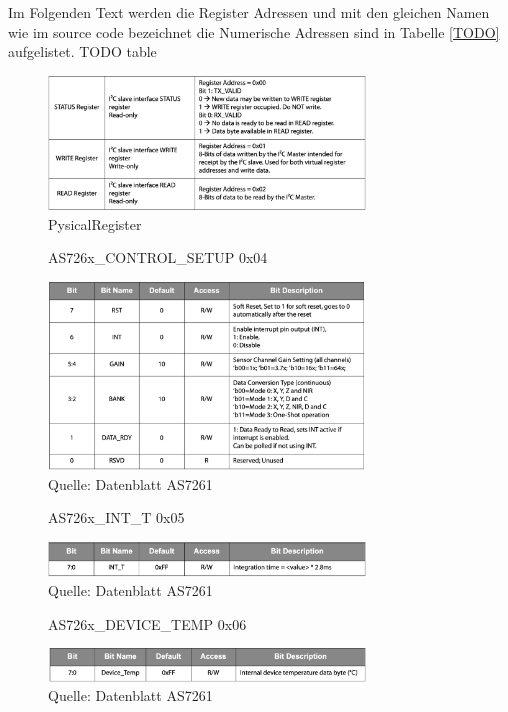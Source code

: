 Im Folgenden Text werden die Register Adressen und mit den gleichen Namen wie im source code bezeichnet die Numerische Adressen sind in Tabelle \ref{TODO} aufgelistet. TODO table

\begin{figure}[H]
\centering
\includegraphics[width=0.75\textwidth]{img/PysicalRegister}
\caption{PysicalRegister}
\label{fig:PysicalRegister}
\end{figure}

\begin{figure}[H]
\centering
\caption{AS726x\_CONTROL\_SETUP 0x04}
\includegraphics[width=0.75\textwidth]{img/AS726x_CONTROL_SETUP}
\caption*{Quelle: Datenblatt AS7261}
\label{fig:AS726x_CONTROL_SETUP}
\end{figure}

\begin{figure}[H]
\centering
\caption{AS726x\_INT\_T 0x05}
\includegraphics[width=0.75\textwidth]{img/AS726x_INT_T}
\caption*{Quelle: Datenblatt AS7261}
\label{fig:AS726x_INT_T}
\end{figure}

\begin{figure}[H]
\centering
\caption{AS726x\_DEVICE\_TEMP 0x06}
\includegraphics[width=0.75\textwidth]{img/AS726x_DEVICE_TEMP}
\caption*{Quelle: Datenblatt AS7261}
\label{fig:AS726x_DEVICE_TEMP}
\end{figure}

